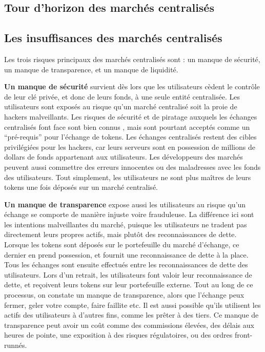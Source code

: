 \documentclass[UTF8,nofonts]{article}
\begin{document}
\begin{multicols}{2}
\section{Tour d'horizon des marchés centralisés\label{sec:current_exchange_landscape}}

\subsection{Les insuffisances des marchés centralisés}
Les trois risques principaux des marchés centralisés sont : un manque de sécurité, un manque de transparence, et un manque de liquidité.

\textbf{Un manque de sécurité} survient dès lors que les utilisateurs cèdent le contrôle de leur clé privée, et donc de leurs fonds, à une seule entité centralisée. Les utilisateurs sont exposés au risque qu'un marché centralisé soit la proie de hackers malveillants. Les risques de sécurité et de piratage auxquels les échanges centralisés font face sont bien connus \cite{coincheckhack} \cite{mcmillan2014inside}, mais sont pourtant acceptés comme un \enquote{pré-requis} pour l'échange de tokens. Les échanges centralisés restent des cibles privilégiées pour les hackers, car leurs serveurs sont en possession de millions de dollars de fonds appartenant aux utilisateurs. Les développeurs des marchés peuvent aussi commettre des erreurs innocentes ou des maladresses avec les fonds des utilisateurs. Tout simplement, les utilisateurs ne sont plus maîtres de leurs tokens une fois déposés sur un marché centralisé.

\textbf{Un manque de transparence} expose aussi les utilisateurs au risque qu'un échange se comporte de manière injuste voire frauduleuse. La différence ici sont les intentions malveillantes du marché, puisque les utilisateurs ne tradent pas directement leurs propres actifs, mais plutôt des reconnaissances de dette. Lorsque les tokens sont déposés sur le portefeuille du marché d'échange, ce dernier en prend possession, et fournit une reconnaissance de dette à la place. Tous les échanges sont ensuite effectués entre les reconnaissances de dette des utilisateurs. Lors d'un retrait, les utilisateurs font valoir leur reconnaissance de dette, et reçoivent leurs tokens sur leur portefeuille externe. Tout au long de ce processus, on constate un manque de transparence, alors que l'échange peux fermer, geler votre compte, faire faillite etc. Il est aussi possible qu'ils utilisent les actifs des utilisateurs à d'autres fins, comme les prêter à des tiers. Ce manque de transparence peut avoir un coût comme des commissions élevées, des délais aux heures de pointe, une exposition à des risques régulatoires, ou des ordres front-runnés.


\end{multicols}
\end{document}
